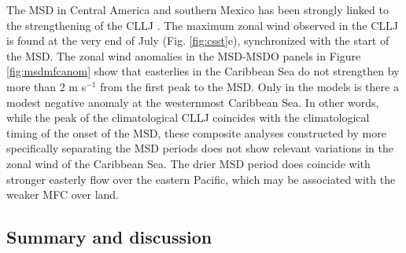 The MSD in Central America and southern Mexico has been strongly linked to the strengthening of the CLLJ \citep{herrera2015}. The maximum zonal wind observed in the CLLJ is found at the very end of July (Fig. \ref{fig:csst}e), synchronized with the start of the MSD. 
The zonal wind anomalies in the MSD-MSDO panels in Figure \ref{fig:msdmfcanom} show that easterlies in the Caribbean Sea do not strengthen by more than 2 m s$^{-1}$ from the first peak to the MSD. Only in the models is there a modest negative anomaly at the westernmost Caribbean Sea. In other words, while the peak of the climatological CLLJ coincides with the climatological timing of the onset of the MSD, these composite analyses constructed by more specifically separating the MSD periods does not show relevant variations in the zonal wind of the Caribbean Sea. 
The drier MSD period does coincide with stronger easterly flow over the eastern Pacific, which may be associated with the weaker MFC over land. %

\subsection{Summary and discussion}\label{sq:sumdiscuss}


